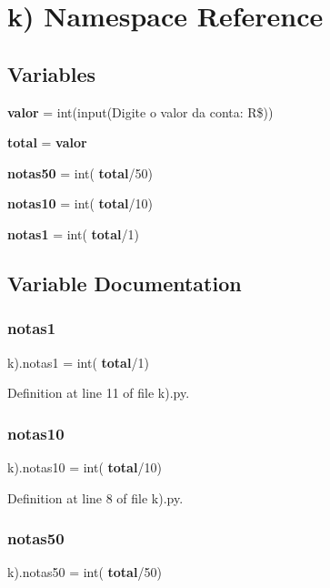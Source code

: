 \section{k) Namespace Reference}
\label{namespacek_08}
\subsection*{Variables}
\begin{DoxyCompactItemize}
\item 
\textbf{ valor} = int(input(\textquotesingle{}Digite o valor da conta\+: R\$\textquotesingle{}))
\item 
\textbf{ total} = \textbf{ valor}
\item 
\textbf{ notas50} = int(\textbf{ total}/50)
\item 
\textbf{ notas10} = int(\textbf{ total}/10)
\item 
\textbf{ notas1} = int(\textbf{ total}/1)
\end{DoxyCompactItemize}


\subsection{Variable Documentation}
\mbox{\label{namespacek_08_a39c81606e12885beab1e1315168276ea}} 
\subsubsection{notas1}
{\footnotesize\ttfamily k).notas1 = int(\textbf{ total}/1)}



Definition at line 11 of file k).\+py.

\mbox{\label{namespacek_08_a52cd8af8003c47cba9b9d62b23fbc4b1}} 
\subsubsection{notas10}
{\footnotesize\ttfamily k).notas10 = int(\textbf{ total}/10)}



Definition at line 8 of file k).\+py.

\mbox{\label{namespacek_08_a9b6205cc18d4ebe1094a162b48f4d7c9}} 
\subsubsection{notas50}
{\footnotesize\ttfamily k).notas50 = int(\textbf{ total}/50)}



